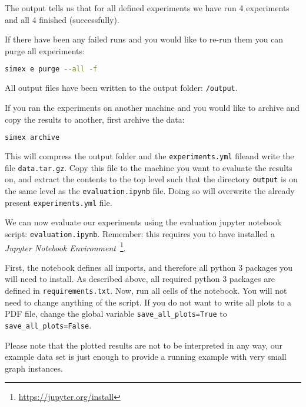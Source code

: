 \documentclass[11pt, a4paper]{scrartcl}
\newcommand{\expfile}{\texttt{experiments.yml} file}
\begin{document}
The output tells us that for all defined experiments we have run 4 experiments
and all 4 finished (successfully).

If there have been any failed runs and you would like to re-run them you can
purge all experiments:

\begin{lstlisting}[language=bash]
simex e purge --all -f
\end{lstlisting}

All output files have been written to the output folder: \texttt{/output}.

If you ran the experiments on another machine and you would like to archive and
copy the results to another, first archive the data:

\begin{lstlisting}[language=bash]
simex archive
\end{lstlisting}

This will compress the output folder and the \expfile and write the file
\texttt{data.tar.gz}. Copy this file to the machine you want to evaluate the
results on, and extract the contents to the top level such that the directory
\texttt{output} is on the same level as the \texttt{evaluation.ipynb} file.
Doing so will overwrite the already present \expfile.

We can now evaluate our experiments using the evaluation jupyter notebook
script: \texttt{evaluation.ipynb}. Remember: this requires you to have installed
a \emph{Jupyter Notebook
Environment}~\footnote{\url{https://jupyter.org/install}}.

First, the notebook defines all imports, and therefore all python 3 packages you
will need to install. As described above, all required python 3 packages are
defined in \texttt{requirements.txt}. Now, run all cells of the notebook. You
will not need to change anything of the script. If you do not want to write all
plots to a PDF file, change the global variable \texttt{save\_all\_plots=True} to
\texttt{save\_all\_plots=False}.

Please note that the plotted results are not to be interpreted in any way, our
example data set is just enough to provide a running example with very small
graph instances.

\end{document}
